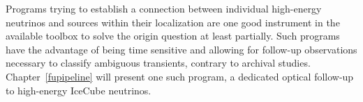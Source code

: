 Programs trying to establish a connection between individual high-energy neutrinos and sources within their localization are one good instrument in the available toolbox to solve the origin question at least partially. Such programs have the advantage of being time sensitive and allowing for follow-up observations necessary to classify ambiguous transients, contrary to archival studies. Chapter~\ref{fupipeline} will present one such program, a dedicated optical follow-up to high-energy IceCube neutrinos.